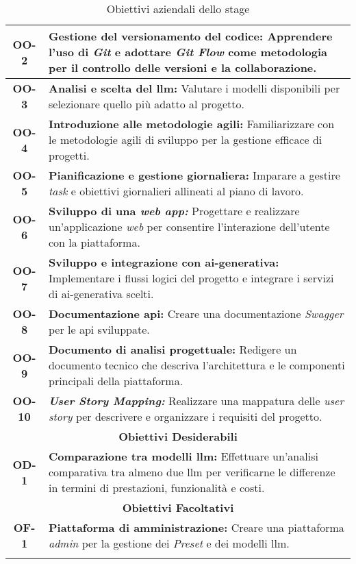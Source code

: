 \begin{longtable}{|c|>{\centering\arraybackslash}p{}|}
    \hline
    \textbf{OO-2} & \textbf{Gestione del versionamento del codice:} Apprendere l'uso di \textit{Git} e adottare \textit{Git Flow} come metodologia per il controllo delle versioni e la collaborazione. \\
    \hline
    \textbf{OO-3} & \textbf{Analisi e scelta del \gls{llm}:} Valutare i modelli disponibili per selezionare quello più adatto al progetto. \\
    \hline
    \textbf{OO-4} & \textbf{Introduzione alle metodologie agili:} Familiarizzare con le metodologie agili di sviluppo per la gestione efficace di progetti. \\
    \hline
    \textbf{OO-5} & \textbf{Pianificazione e gestione giornaliera:} Imparare a gestire \textit{task} e obiettivi giornalieri allineati al piano di lavoro. \\
    \hline
    \textbf{OO-6} & \textbf{Sviluppo di una \textit{web app:}} Progettare e realizzare un'applicazione \textit{web} per consentire l'interazione dell'utente con la piattaforma. \\
    \hline
    \textbf{OO-7} & \textbf{Sviluppo e integrazione con \gls{ai-generativa}:} Implementare i flussi logici del progetto e integrare i servizi di \gls{ai-generativa} scelti. \\
    \hline
    \textbf{OO-8} & \textbf{Documentazione \gls{api}:} Creare una documentazione \textit{Swagger} per le \gls{api} sviluppate. \\
    \hline
    \textbf{OO-9} & \textbf{Documento di analisi progettuale:} Redigere un documento tecnico che descriva l'architettura e le componenti principali della piattaforma. \\
    \hline
    \textbf{OO-10} & \textbf{\textit{User Story Mapping:}} Realizzare una mappatura delle \textit{user story} per descrivere e organizzare i requisiti del progetto. \\
    \hline
    \multicolumn{2}{|c|}{\rowcolor{green!30} \textbf{Obiettivi Desiderabili}} \\
    \hline %
    \textbf{OD-1} & \textbf{Comparazione tra modelli \gls{llm}:} Effettuare un'analisi comparativa tra almeno due \gls{llm} per verificarne le differenze in termini di prestazioni, funzionalità e costi. \\
    \hline
    \multicolumn{2}{|c|}{\rowcolor{green!30} \textbf{Obiettivi Facoltativi}} \\
    \noalign{\hrule} %
    \textbf{OF-1} & \textbf{Piattaforma di amministrazione:} Creare una piattaforma \textit{admin} per la gestione dei \textit{Preset} e dei modelli \gls{llm}. \\
    \hline
    \caption{Obiettivi aziendali dello stage} %
    \label{tab:obiettivi_stage} %
\end{longtable}

